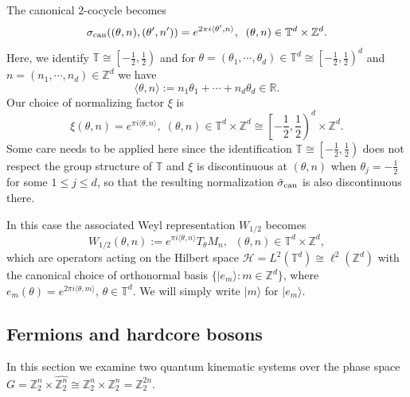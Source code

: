 \documentclass[12pt,reqno]{amsart}
\theoremstyle{definition}
\theoremstyle{definition}
\theoremstyle{definition}
\numberwithin{thm}{section}
\numberwithin{equation}{section}
\newcommand{\Real}{\mathbb R}
\newcommand{\la}{\langle}
\newcommand{\ra}{\rangle}
\newcommand{\Hi}{\mathcal{H}}
\newcommand{\tor}{\mathbb{T}}
\newcommand{\z}{\mathbb{Z}}
\begin{document}
The canonical 2-cocycle becomes
    $$\sigma_{\rm can}((\theta, n), (\theta',n')) = e^{2\pi i \la  \theta', n \ra},\;\; (\theta, n)\in \tor^d \times \z^d.$$
Here, we identify $\tor \cong \left[-\frac{1}{2},\frac{1}{2}\right)$ and for $\theta = (\theta_1,\cdots, \theta_d) \in \tor^d \cong \left[-\frac{1}{2},\frac{1}{2}\right)^d$ and $n = (n_1,\cdots, n_d) \in \z^d$ we have
\begin{equation} \label{eq-angle-number-duality}
    \la  \theta, n \ra := n_1\theta_1 + \cdots + n_d\theta_d \in \Real.
\end{equation}
Our choice of normalizing factor $\xi$ is
    \begin{equation}\label{eq-xi-choice}
        \xi(\theta,n)=e^{\pi i\la \theta, n\ra},\; (\theta,n)\in \tor^d\times \z^d \cong \left[-\frac{1}{2},\frac{1}{2}\right)^d \times \z^d.
    \end{equation}
Some care needs to be applied here since the identification $\tor \cong \left[-\frac{1}{2},\frac{1}{2}\right)$ does not respect the group structure of $\tor$ and $\xi$ is discontinuous at $(\theta, n)$ when $\theta_j = -\frac{1}{2}$ for some $1\le j\le d$, so that the resulting normalization $\tilde{\sigma}_{\rm can}$ is also discontinuous there.

In this case the associated Weyl representation $W_{1/2}$ becomes
    $$W_{1/2}(\theta,n):=e^{\pi i\la  \theta, n \ra}T_\theta M_n,\;\; (\theta,n)\in \tor^d\times \z^d,$$
which are operators acting on the Hilbert space $\Hi = L^2(\tor^d)\cong \ell^2(\z^d)$ with the canonical choice of orthonormal basis $\{|e_m\ra : m\in \z^d\}$, where $e_m(\theta) = e^{2\pi i \la \theta, m\ra}$, $\theta \in \tor^d$. We will simply write $|m\ra$ for $|e_m\ra$.



\subsection{Fermions and hardcore bosons}\label{ss:fermion}

In this section we examine two quantum kinematic systems over the phase space $G=\z_2^n\times \widehat{\z_2^n}\cong \z_2^{n}\times \z_2^n=\z_2^{2n}$.
\end{document}
